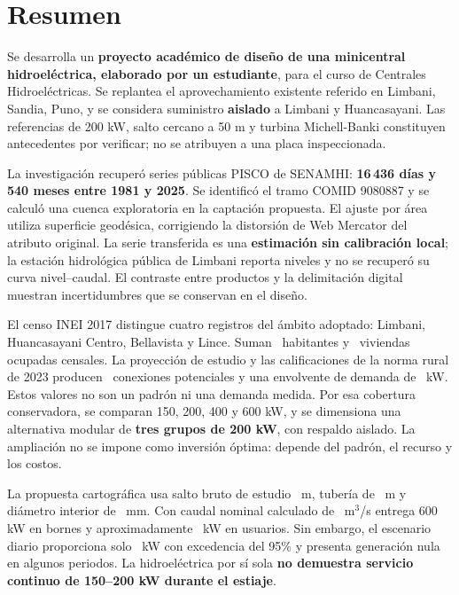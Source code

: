 \documentclass[11pt,letterpaper]{report}
\begin{document}
\hypersetup{pageanchor=false}

\hypersetup{pageanchor=true}
\chapter*{Resumen}
Se desarrolla un \textbf{proyecto académico de diseño de una minicentral hidroeléctrica, elaborado por un estudiante}, para el curso de Centrales Hidroeléctricas. Se replantea el aprovechamiento existente referido en Limbani, Sandia, Puno, y se considera suministro \textbf{aislado} a Limbani y Huancasayani. Las referencias de 200 kW, salto cercano a 50 m y turbina Michell-Banki constituyen antecedentes por verificar; no se atribuyen a una placa inspeccionada.

La investigación recuperó series públicas PISCO de SENAMHI: \textbf{16\,436 días y 540 meses entre 1981 y 2025}. Se identificó el tramo COMID 9080887 y se calculó una cuenca exploratoria en la captación propuesta. El ajuste por área utiliza superficie geodésica, corrigiendo la distorsión de Web Mercator del atributo original. La serie transferida es una \textbf{estimación sin calibración local}; la estación hidrológica pública de Limbani reporta niveles y no se recuperó su curva nivel--caudal. El contraste entre productos y la delimitación digital muestran incertidumbres que se conservan en el diseño.

El censo INEI 2017 distingue cuatro registros del ámbito adoptado: Limbani, Huancasayani Centro, Bellavista y Lince. Suman \ habitantes y \ viviendas ocupadas censales. La proyección de estudio y las calificaciones de la norma rural de 2023 producen \ conexiones potenciales y una envolvente de demanda de \ kW. Estos valores no son un padrón ni una demanda medida. Por esa cobertura conservadora, se comparan 150, 200, 400 y 600 kW, y se dimensiona una alternativa modular de \textbf{tres grupos de 200 kW}, con respaldo aislado. La ampliación no se impone como inversión óptima: depende del padrón, el recurso y los costos.

La propuesta cartográfica usa salto bruto de estudio \ m, tubería de \ m y diámetro interior de \ mm. Con caudal nominal calculado de \ m$^3$/s entrega 600 kW en bornes y aproximadamente \ kW en usuarios. Sin embargo, el escenario diario proporciona solo \ kW con excedencia del 95\% y presenta generación nula en algunos periodos. La hidroeléctrica por sí sola \textbf{no demuestra servicio continuo de 150--200 kW durante el estiaje}.
\end{document}
